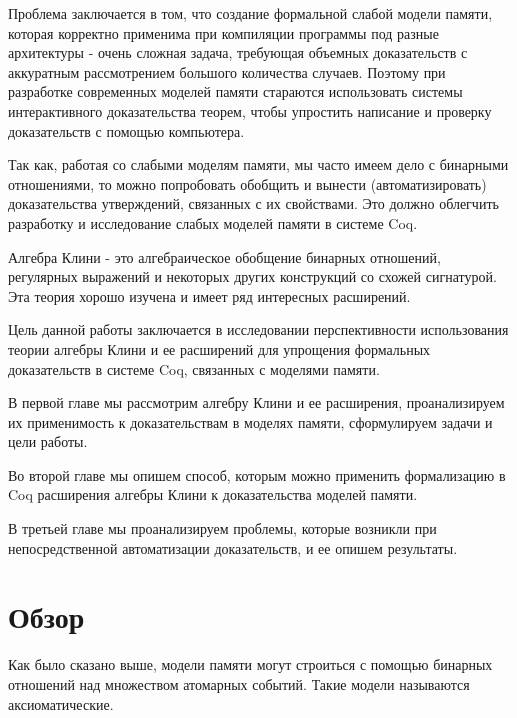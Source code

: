 \documentclass[times
              ]{itmo-student-thesis}
\begin{document}
  Проблема заключается в том, что создание формальной слабой модели памяти, которая корректно применима
  при компиляции программы под разные архитектуры - очень сложная задача, требующая объемных
  доказательств с аккуратным рассмотрением большого количества случаев.
  Поэтому при разработке современных моделей памяти стараются использовать системы интерактивного
  доказательства теорем\cite{rc11}, чтобы упростить написание и проверку доказательств с помощью
  компьютера.

  Так как, работая со слабыми моделям памяти, мы часто имеем дело с бинарными отношениями, то можно
  попробовать обобщить и вынести (автоматизировать) доказательства утверждений, связанных с их свойствами.
  Это должно облегчить разработку и исследование слабых моделей памяти в системе Coq.

  Алгебра Клини - это алгебраическое обобщение бинарных отношений, регулярных выражений и некоторых
  других конструкций со схожей сигнатурой.
  Эта теория хорошо изучена и имеет ряд интересных расширений.

  Цель данной работы заключается в исследовании перспективности использования теории алгебры Клини и ее
  расширений для упрощения формальных доказательств в системе Coq, связанных с моделями памяти.


  В первой главе мы рассмотрим алгебру Клини и ее расширения, проанализируем их применимость к
  доказательствам в моделях памяти, сформулируем задачи и цели работы.

  Во второй главе мы опишем способ, которым можно применить формализацию в Coq расширения алгебры Клини к
  доказательства моделей памяти.

  В третьей главе мы проанализируем проблемы, которые возникли при непосредственной автоматизации
  доказательств, и ее опишем результаты.

\chapter{Обзор}
\startrelatedwork

  Как было сказано выше, модели памяти могут строиться с помощью бинарных отношений над множеством
  атомарных событий. Такие модели называются аксиоматические\cite{axiomatic_memory_model_for_power_mp}.
\end{document}
